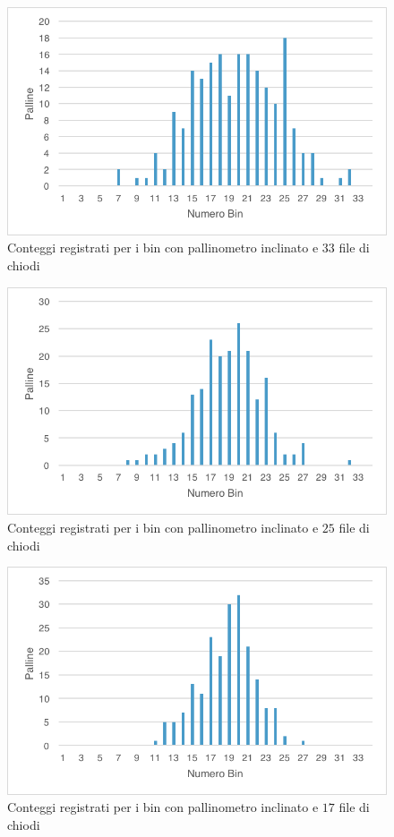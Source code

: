 \documentclass[10pt,oneside,a4paper]{article}
\begin{document}
\begin{figure}[H]
\caption{Conteggi registrati per i bin con pallinometro inclinato e $33$ file di chiodi}
\label{fig:palli_inclinato_33}
\centering
\includegraphics[scale=0.9]{pallinometro_inclinato_foro1.png}
\end{figure}
\begin{figure}[H]
\caption{Conteggi registrati per i bin con pallinometro inclinato e $25$ file di chiodi}
\label{fig:palli_inclinato_25}
\centering
\includegraphics[scale=0.9]{pallinometro_inclinato_foro2.png}
\end{figure}
\begin{figure}[H]
\caption{Conteggi registrati per i bin con pallinometro inclinato e $17$ file di chiodi}
\label{fig:palli_inclinato_17}
\centering
\includegraphics[scale=0.9]{pallinometro_inclinato_foro3.png}
\end{figure}
\end{document}
